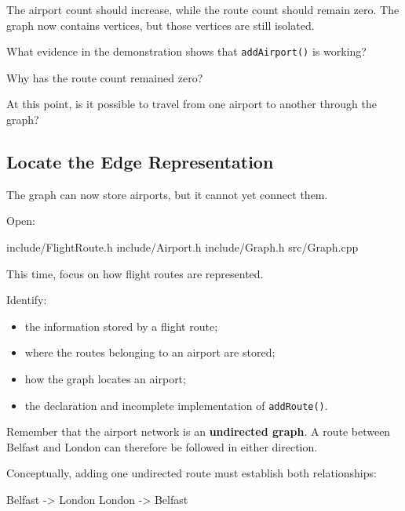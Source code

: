 \documentclass{csc2059practical}
\begin{document}
The airport count should increase, while the route count should remain zero.
The graph now contains vertices, but those vertices are still isolated.

\begin{reflectionbox}
What evidence in the demonstration shows that
\texttt{addAirport()} is working?

Why has the route count remained zero?

At this point, is it possible to travel from one airport to another through the
graph?
\end{reflectionbox}


\subsection{Locate the Edge Representation}

The graph can now store airports, but it cannot yet connect them.

Open:

\begin{terminal}
include/FlightRoute.h
include/Airport.h
include/Graph.h
src/Graph.cpp
\end{terminal}

This time, focus on how flight routes are represented.

Identify:

\begin{itemize}
\item the information stored by a flight route;
\item where the routes belonging to an airport are stored;
\item how the graph locates an airport;
\item the declaration and incomplete implementation of
\texttt{addRoute()}.
\end{itemize}

Remember that the airport network is an \textbf{undirected graph}. A route
between Belfast and London can therefore be followed in either direction.

Conceptually, adding one undirected route must establish both relationships:

\begin{cppcode}
Belfast -> London
London  -> Belfast
\end{cppcode}
\end{document}
